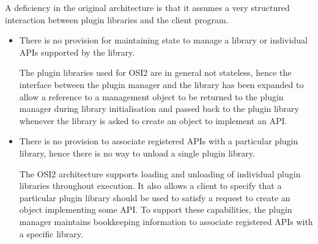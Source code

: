 \documentclass{article}
\newcommand{\OsiTwo}{OSI2\xspace}
\begin{document}
A deficiency in the original architecture is that it assumes a very structured
interaction between plugin libraries and the client program.
\begin{itemize}
  \item
  There is no provision for maintaining state to manage a library or individual
  APIs supported by the library.

  The plugin libraries used for \OsiTwo are in general not stateless, hence the
  interface between the plugin manager and the library  has been expanded
  to allow a reference to a management object to be returned to the plugin
  manager during library initialisation and passed back to the plugin library
  whenever the library is asked to create an object to implement an API.

  \item
  There is no provision to associate registered APIs with a
  particular plugin library, hence there is no way to unload a single plugin
  library.

  The \OsiTwo architecture supports loading and unloading of individual plugin
  libraries throughout execution.
  It also allows a client to specify that a particular plugin library should
  be used to satisfy a request to create an object implementing some API\@.
  To support these capabilities, the plugin manager maintains
  bookkeeping information to associate registered APIs with a specific library.
\end{itemize}
\end{document}
